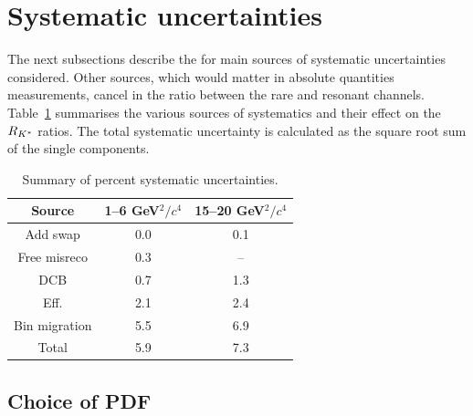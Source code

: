 \section{Systematic uncertainties}
\label{sec:systematics}

The next subsections describe the for main sources of systematic uncertainties considered.
Other sources, which would matter in absolute quantities measurements,
cancel in the ratio between the rare and resonant channels. Table~\ref{tab:RKst_systematics}
summarises the various sources of systematics and their effect on the $R_{{{K}^*}}$ ratios.
The total systematic uncertainty is calculated as the square root sum of the single components.

\begin{table}[hb!]
\begin{center}
\caption{Summary of percent systematic uncertainties.}
\begin{tabular}{|c|c|c|}
\hline
Source              & 1--6 GeV$^2/c^4$ &  15--20 GeV$^2/c^4$ \\ \hline
Add swap            & 0.0         & 0.1    \\
Free misreco        & 0.3     &  --                                   \\
DCB                 & 0.7       & 1.3  \\

\hline

Eff.               & 2.1               & 2.4         \\
Bin migration      & 5.5                     & 6.9   \\

\hline

Total              & 5.9               & 7.3   \\

\hline 
\end{tabular}
\label{tab:RKst_systematics}
\end{center}
\end{table}



\subsection{Choice of PDF}

